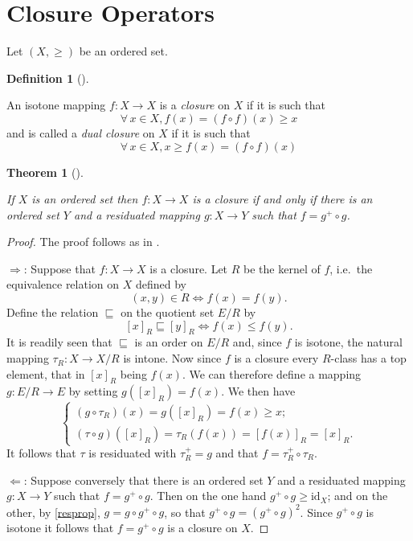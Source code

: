 \documentclass[
  letterpaper,
  10pt,
  reqno,
  twopage,
  openany]{book}
\theoremstyle{plain}
\theoremstyle{definition}
\theoremstyle{definition}
\newtheorem{definition}{Definition}[chapter]
\theoremstyle{definition}
\theoremstyle{plain}
\theoremstyle{plain}
\newtheorem{theorem}{Theorem}[chapter]
\theoremstyle{remark}
\begin{document}
\hypertarget{closure-operators}{%
\section{Closure Operators}\label{closure-operators}}

Let \((X,\geq)\) be an ordered set.

\leavevmode{}%
\begin{definition}[]\label{def-}

An isotone mapping \(f : X \to X\) is a \emph{closure} on \(X\) if it is
such that \[
\forall \, x\in X,   f(x)=(f\circ f)(x) \geq x
\] and is called a \emph{dual closure} on \(X\) if it is such that \[
\forall \, x\in X,   x\geq f(x)=(f\circ f)(x)
\]

\end{definition}

\leavevmode{}%
\begin{theorem}[]\label{thm-}

If \(X\) is an ordered set then \(f : X \to X\) is a closure if and only
if there is an ordered set \(Y\) and a residuated mapping
\(g : X \to Y\) such that \(f = g^+ \circ g\).

\end{theorem}

\begin{proof}

The proof follows as in \cite[p. 10]{MR2126425}.

\par

\(\Rightarrow\): Suppose that \(f:X\to X\) is a closure. Let \(R\) be
the kernel of \(f\), i.e.~the equivalence relation on \(X\) defined by
\[
(x,y)\in R \Longleftrightarrow f(x)=f(y).
\] Define the relation \(\sqsubseteq\) on the quotient set \(E/R\) by \[
[x]_R \sqsubseteq [y]_R \Longleftrightarrow f(x)\leq f(y).
\] It is readily seen that \(\sqsubseteq\) is an order on \(E/R\) and,
since \(f\) is isotone, the natural mapping \(\tau_R :X\to X/R\) is
intone. Now since \(f\) is a closure every \(R\)-class has a top
element, that in \([x]_R\) being \(f(x)\). We can therefore define a
mapping \(g:E/R\to E\) by setting \(g([x]_R)=f(x)\). We then have \[
\begin{cases}
(g\circ \tau_R)(x)=g([x]_R)=f(x)\geq x; \\
(\tau\circ g)([x]_R)=\tau_R(f(x))=[f(x)]_R=[x]_R.
\end{cases}
\] It follows that \(\tau\) is residuated with \(\tau_R^+=g\) and that
\(f=\tau_R^+\circ \tau_R\).

\par

\(\Leftarrow\): Suppose conversely that there is an ordered set \(Y\)
and a residuated mapping \(g : X \to Y\) such that \(f = g^+ \circ g\).
Then on the one hand \(g^+ \circ g \geq \text{id}_X\); and on the other,
by \ref{resprop}, \(g = g \circ g^+ \circ g\), so that
\(g^+ \circ g = (g^+ \circ g)^2\). Since \(g^+\circ g\) is isotone it
follows that \(f=g^+\circ g\) is a closure on \(X\).

\end{proof}
\end{document}

